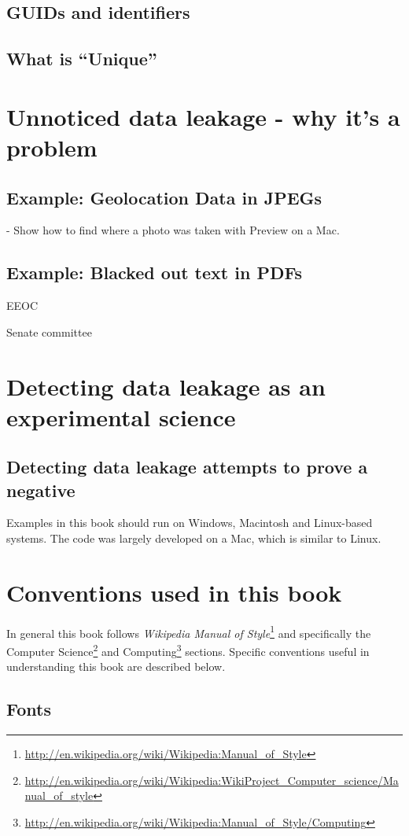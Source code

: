 \subsection{GUIDs and identifiers}
\subsection{What is ``Unique''}
\section{Unnoticed data leakage - why it's a problem}
\subsection{Example: Geolocation Data in JPEGs}
  - Show how to find where a photo was taken with Preview on a Mac. 
\subsection{Example: Blacked out text in PDFs}
EEOC

Senate committee

\section{Detecting data leakage as an experimental science}
\subsection{Detecting data leakage attempts to prove a negative}


Examples in this book should run on Windows, Macintosh and Linux-based
systems. The code was largely developed on a Mac, which is similar to
Linux. 

\section{Conventions used in this book}
In general this book follows \emph{Wikipedia Manual of
  Style}\footnote{\url{http://en.wikipedia.org/wiki/Wikipedia:Manual_of_Style}}
and specifically the Computer
Science\footnote{\url{http://en.wikipedia.org/wiki/Wikipedia:WikiProject_Computer_science/Manual_of_style}}
  and
  Computing\footnote{\url{http://en.wikipedia.org/wiki/Wikipedia:Manual_of_Style/Computing}}
  sections. Specific conventions useful in understanding this book are
  described below.

\subsection{Fonts}

